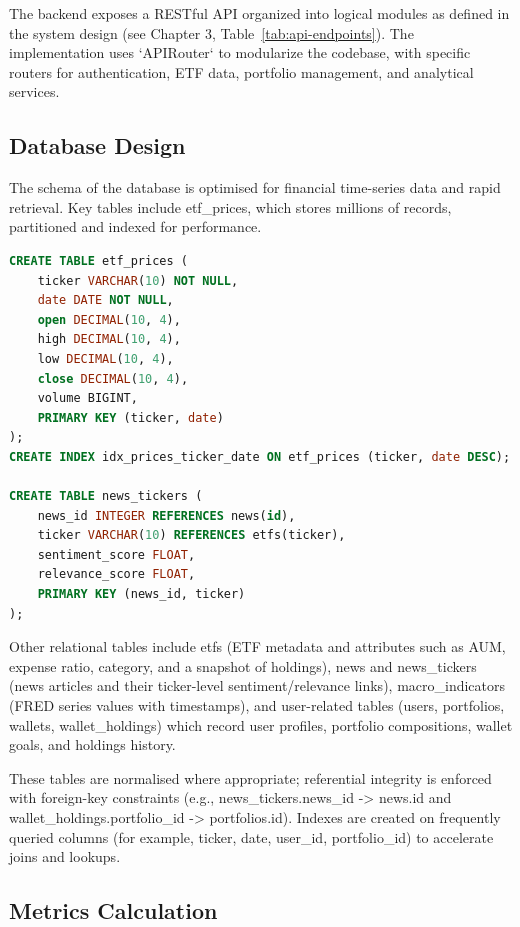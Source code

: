 The backend exposes a RESTful API organized into logical modules as defined in the system design (see Chapter 3, Table~\ref{tab:api-endpoints}). The implementation uses `APIRouter` to modularize the codebase, with specific routers for authentication, ETF data, portfolio management, and analytical services.

\subsection{Database Design}

The schema of the database is optimised for financial time-series data and rapid retrieval. Key tables include etf\_prices, which stores millions of records, partitioned and indexed for performance.

\begin{lstlisting}[language=SQL, caption={Core Tables Schema}, basicstyle=\ttfamily\footnotesize]
CREATE TABLE etf_prices (
    ticker VARCHAR(10) NOT NULL,
    date DATE NOT NULL,
    open DECIMAL(10, 4),
    high DECIMAL(10, 4),
    low DECIMAL(10, 4),
    close DECIMAL(10, 4),
    volume BIGINT,
    PRIMARY KEY (ticker, date)
);
CREATE INDEX idx_prices_ticker_date ON etf_prices (ticker, date DESC);

CREATE TABLE news_tickers (
    news_id INTEGER REFERENCES news(id),
    ticker VARCHAR(10) REFERENCES etfs(ticker),
    sentiment_score FLOAT,
    relevance_score FLOAT,
    PRIMARY KEY (news_id, ticker)
);
\end{lstlisting}

Other relational tables include etfs (ETF metadata and attributes such as AUM, expense ratio, category, and a snapshot of holdings), news and news\_tickers (news articles and their ticker-level sentiment/relevance links), macro\_indicators (FRED series values with timestamps), and user-related tables (users, portfolios, wallets, wallet\_holdings) which record user profiles, portfolio compositions, wallet goals, and holdings history. 


These tables are normalised where appropriate; referential integrity is enforced with foreign-key constraints (e.g., news\_tickers.news\_id -> news.id and wallet\_holdings.portfolio\_id -> portfolios.id). Indexes are created on frequently queried columns (for example, ticker, date, user\_id, portfolio\_id) to accelerate joins and lookups.


\subsection{Metrics Calculation}

